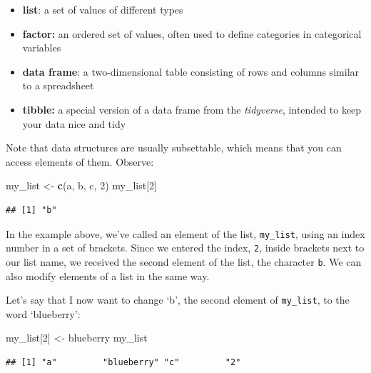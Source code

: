 \documentclass[
]{book}
\newenvironment{Shaded}{\begin{snugshade}}{\end{snugshade}}
\newcommand{\DecValTok}[1]{\textcolor[rgb]{0.00,0.00,0.81}{#1}}
\newcommand{\FunctionTok}[1]{\textcolor[rgb]{0.13,0.29,0.53}{\textbf{#1}}}
\newcommand{\NormalTok}[1]{#1}
\newcommand{\OtherTok}[1]{\textcolor[rgb]{0.56,0.35,0.01}{#1}}
\newcommand{\StringTok}[1]{\textcolor[rgb]{0.31,0.60,0.02}{#1}}
\providecommand{\tightlist}{%
  \setlength{\itemsep}{0pt}\setlength{\parskip}{0pt}}
\begin{document}
\begin{itemize}
\tightlist
\item
  \textbf{list}: a set of values of different types
\item
  \textbf{factor:} an ordered set of values, often used to define categories in categorical variables
\item
  \textbf{data frame}: a two-dimensional table consisting of rows and columns similar to a spreadsheet
\item
  \textbf{tibble:} a special version of a data frame from the \emph{tidyverse}, intended to keep your data nice and tidy
\end{itemize}

Note that data structures are usually subsettable, which means that you can access elements of them. Observe:

\begin{Shaded}
\begin{Highlighting}[]
\NormalTok{my\_list }\OtherTok{\textless{}{-}} \FunctionTok{c}\NormalTok{(}\StringTok{\textquotesingle{}a\textquotesingle{}}\NormalTok{, }\StringTok{\textquotesingle{}b\textquotesingle{}}\NormalTok{, }\StringTok{\textquotesingle{}c\textquotesingle{}}\NormalTok{, }\DecValTok{2}\NormalTok{)}
\NormalTok{my\_list[}\DecValTok{2}\NormalTok{]}
\end{Highlighting}
\end{Shaded}

\begin{verbatim}
## [1] "b"
\end{verbatim}

In the example above, we've called an element of the list, \texttt{my\_list}, using an index number in a set of brackets. Since we entered the index, \texttt{2}, inside brackets next to our list name, we received the second element of the list, the character \texttt{b}. We can also modify elements of a list in the same way.

Let's say that I now want to change `b', the second element of \texttt{my\_list}, to the word `blueberry':

\begin{Shaded}
\begin{Highlighting}[]
\NormalTok{my\_list[}\DecValTok{2}\NormalTok{] }\OtherTok{\textless{}{-}} \StringTok{\textquotesingle{}blueberry\textquotesingle{}}
\NormalTok{my\_list}
\end{Highlighting}
\end{Shaded}

\begin{verbatim}
## [1] "a"         "blueberry" "c"         "2"
\end{verbatim}
\end{document}
